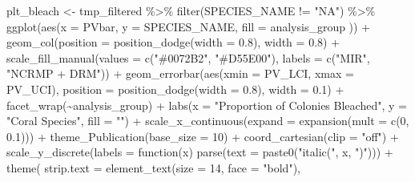 \documentclass[
]{article}
\newenvironment{Shaded}{\begin{snugshade}}{\end{snugshade}}
\newcommand{\AttributeTok}[1]{\textcolor[rgb]{0.40,0.45,0.13}{#1}}
\newcommand{\ControlFlowTok}[1]{\textcolor[rgb]{0.00,0.23,0.31}{#1}}
\newcommand{\DecValTok}[1]{\textcolor[rgb]{0.68,0.00,0.00}{#1}}
\newcommand{\FloatTok}[1]{\textcolor[rgb]{0.68,0.00,0.00}{#1}}
\newcommand{\FunctionTok}[1]{\textcolor[rgb]{0.28,0.35,0.67}{#1}}
\newcommand{\NormalTok}[1]{\textcolor[rgb]{0.00,0.23,0.31}{#1}}
\newcommand{\OtherTok}[1]{\textcolor[rgb]{0.00,0.23,0.31}{#1}}
\newcommand{\SpecialCharTok}[1]{\textcolor[rgb]{0.37,0.37,0.37}{#1}}
\newcommand{\StringTok}[1]{\textcolor[rgb]{0.13,0.47,0.30}{#1}}
\begin{document}
\begin{Shaded}
\begin{Highlighting}[]
\NormalTok{plt\_bleach }\OtherTok{\textless{}{-}}\NormalTok{ tmp\_filtered }\SpecialCharTok{\%\textgreater{}\%}
  \FunctionTok{filter}\NormalTok{(SPECIES\_NAME }\SpecialCharTok{!=} \StringTok{"NA"}\NormalTok{) }\SpecialCharTok{\%\textgreater{}\%}
  \FunctionTok{ggplot}\NormalTok{(}\FunctionTok{aes}\NormalTok{(}\AttributeTok{x =}\NormalTok{ PVbar, }\AttributeTok{y =}\NormalTok{ SPECIES\_NAME, }\AttributeTok{fill =}\NormalTok{ analysis\_group )) }\SpecialCharTok{+}
  \FunctionTok{geom\_col}\NormalTok{(}\AttributeTok{position =} \FunctionTok{position\_dodge}\NormalTok{(}\AttributeTok{width =} \FloatTok{0.8}\NormalTok{), }\AttributeTok{width =} \FloatTok{0.8}\NormalTok{) }\SpecialCharTok{+}
  \FunctionTok{scale\_fill\_manual}\NormalTok{(}\AttributeTok{values =} \FunctionTok{c}\NormalTok{(}\StringTok{"\#0072B2"}\NormalTok{, }\StringTok{"\#D55E00"}\NormalTok{), }\AttributeTok{labels =} \FunctionTok{c}\NormalTok{(}\StringTok{"MIR"}\NormalTok{, }\StringTok{"NCRMP + DRM"}\NormalTok{)) }\SpecialCharTok{+}
  \FunctionTok{geom\_errorbar}\NormalTok{(}\FunctionTok{aes}\NormalTok{(}\AttributeTok{xmin =}\NormalTok{ PV\_LCI, }\AttributeTok{xmax =}\NormalTok{ PV\_UCI),}
                \AttributeTok{position =} \FunctionTok{position\_dodge}\NormalTok{(}\AttributeTok{width =} \FloatTok{0.8}\NormalTok{), }\AttributeTok{width =} \FloatTok{0.1}\NormalTok{) }\SpecialCharTok{+}
  \FunctionTok{facet\_wrap}\NormalTok{(}\SpecialCharTok{\textasciitilde{}}\NormalTok{analysis\_group) }\SpecialCharTok{+}
    \FunctionTok{labs}\NormalTok{(}\AttributeTok{x =} \StringTok{"Proportion of Colonies Bleached"}\NormalTok{, }\AttributeTok{y =} \StringTok{"Coral Species"}\NormalTok{, }\AttributeTok{fill =} \StringTok{""}\NormalTok{) }\SpecialCharTok{+}
    \FunctionTok{scale\_x\_continuous}\NormalTok{(}\AttributeTok{expand =} \FunctionTok{expansion}\NormalTok{(}\AttributeTok{mult =} \FunctionTok{c}\NormalTok{(}\DecValTok{0}\NormalTok{, }\FloatTok{0.1}\NormalTok{))) }\SpecialCharTok{+}
        \FunctionTok{theme\_Publication}\NormalTok{(}\AttributeTok{base\_size =} \DecValTok{10}\NormalTok{) }\SpecialCharTok{+}
    \FunctionTok{coord\_cartesian}\NormalTok{(}\AttributeTok{clip =} \StringTok{"off"}\NormalTok{) }\SpecialCharTok{+}
        \FunctionTok{scale\_y\_discrete}\NormalTok{(}\AttributeTok{labels =} \ControlFlowTok{function}\NormalTok{(x) }\FunctionTok{parse}\NormalTok{(}\AttributeTok{text =} \FunctionTok{paste0}\NormalTok{(}\StringTok{"italic(\textquotesingle{}"}\NormalTok{, x, }\StringTok{"\textquotesingle{})"}\NormalTok{))) }\SpecialCharTok{+}
    \FunctionTok{theme}\NormalTok{(}
          \AttributeTok{strip.text =} \FunctionTok{element\_text}\NormalTok{(}\AttributeTok{size =} \DecValTok{14}\NormalTok{, }\AttributeTok{face =} \StringTok{"bold"}\NormalTok{),}

\end{Highlighting}
\end{Shaded}
\end{document}
